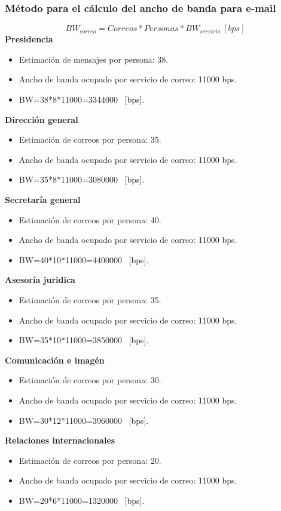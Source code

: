 \documentclass[12pt,letterpaper]{article}
\begin{document}
\newpage
\subsubsection{Método para el cálculo del ancho de banda para e-mail}
\begin{equation}
    BW_{correo}=Correos*Personas*BW_{servicio} \ [bps]
\end{equation}
\textbf{Presidencia}
\begin{itemize}
    \item Estimación de mensajes por persona: 38. 
    \item Ancho de banda ocupado por servicio de correo: 11000 bps.
    \item BW=38*8*11000=3344000 \ [bps].
\end{itemize}
\textbf{Dirección general}
\begin{itemize}
    \item Estimación de correos por persona: 35. 
    \item Ancho de banda ocupado por servicio de correo: 11000 bps.
    \item BW=35*8*11000=3080000 \ [bps].
\end{itemize}
\textbf{Secretaría general}
\begin{itemize}
    \item Estimación de correos por persona: 40. 
    \item Ancho de banda ocupado por servicio de correo: 11000 bps.
    \item BW=40*10*11000=4400000 \ [bps].
\end{itemize}
\textbf{Asesoría juridica}
\begin{itemize}
    \item Estimación de correos por persona: 35. 
    \item Ancho de banda ocupado por servicio de correo: 11000 bps.
    \item BW=35*10*11000=3850000 \ [bps].
\end{itemize}
\textbf{Comunicación e imagén}
\begin{itemize}
    \item Estimación de correos por persona: 30. 
    \item Ancho de banda ocupado por servicio de correo: 11000 bps.
    \item BW=30*12*11000=3960000 \ [bps].
\end{itemize}
\textbf{Relaciones internacionales}
\begin{itemize}
    \item Estimación de correos por persona: 20. 
    \item Ancho de banda ocupado por servicio de correo: 11000 bps.
    \item BW=20*6*11000=1320000 \ [bps].
\end{itemize}
\end{document}
